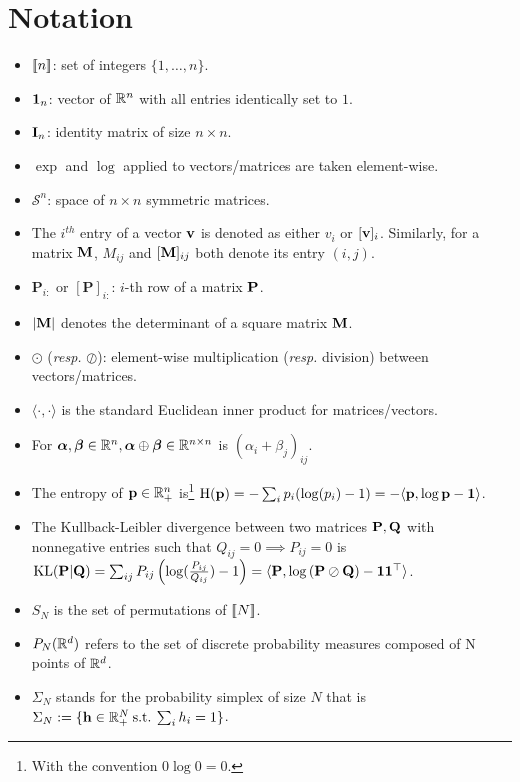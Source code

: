 \section*{Notation}

\begin{itemize}
	\item ${[\![n]\!]}$: set of integers $\{1,\dots,n\}$.
	\item $\bm{1}_{n}$: vector of $\mathbb{R}^{n}$ with all entries identically set to $1$.
	\item ${\mathbf{I}}_n$: identity matrix of size $n \times n$.
    \item $\exp$ and $\log$ applied to vectors/matrices are taken element-wise.
    \item $\mathcal{S}^n$: space of $n \times n$ symmetric matrices.
    \item The $i^{th}$ entry of a vector ${\mathbf{v}}$ is denoted as either $v_i$ or $[{\mathbf{v}}]_i$.
	Similarly, for a matrix ${\mathbf{M}}$, $M_{ij}$ and $[{\mathbf{M}}]_{ij}$ both denote its entry $(i,j)$.
    \item $\mathbf{P}_{i:}$ or $[\mathbf{P}]_{i:}$: $i$-th row of a matrix $\mathbf{P}$.
    \item $|{\mathbf{M}}|$ denotes the determinant of a square matrix ${\mathbf{M}}$.
    \item $\odot$ (\textit{resp.} $\oslash$): element-wise multiplication (\textit{resp.} division) between vectors/matrices.
    \item $\langle \cdot, \cdot \rangle$ is the standard Euclidean inner product for matrices/vectors.
    \item For $\bm{\alpha}, \bm{\beta} \in \mathbb{R}^n, \bm{\alpha} \oplus \bm{\beta} \in \mathbb{R}^{n \times n}$ is $(\alpha_i + \beta_j)_{ij}$.
    \item The entropy of $\mathbf{p} \in \mathbb{R}^{n}_+$ is\footnote{With the convention $0 \log 0 = 0$.} $\operatorname{H}(\mathbf{p}) = -\sum_{i} p_i(\log(p_i)-1) = -\langle \mathbf{p}, \log \mathbf{p} - \bm{1} \rangle$.
    \item The Kullback-Leibler divergence between two matrices $\mathbf{P}, \mathbf{Q}$ with nonnegative entries such that $Q_{ij} = 0 \implies P_{ij}=0$ is $\operatorname{KL}(\mathbf{P} | \mathbf{Q}) = \sum_{ij} P_{ij}\left(\log(\frac{P_{ij}}{Q_{ij}})-1\right) = \langle \mathbf{P}, \log \left(\mathbf{P} \oslash \mathbf{Q} \right) - \bm{1}\bm{1}^\top \rangle$.
    \item $S_N$ is the set of permutations of ${[\![N]\!]}$.
    \item $P_N(\mathbb{R}^d)$ refers to the set of discrete probability measures composed of N points of $\mathbb{R}^d$.
    \item $\Sigma_N$ stands for the probability simplex of size $N$ that is $\Sigma_N := \{{\mathbf{h}} \in \mathbb{R}^N_+ \: \text{s.t.} \: \sum_i h_i = 1 \}$.

\end{itemize}
